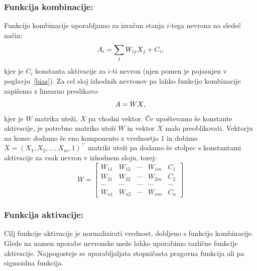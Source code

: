 \documentclass[mat1]{fmfdelo}
\begin{document}
\subsubsection{Funkcija kombinacije:}
Funkcijo kombinacije uporabljamo za izračun stanja $i$-tega nevrona na sledeč način:
%
\begin{equation*}
A_i= \sum_{j}W_{ij}X_j + C_i \text,
\end{equation*}
%
kjer je  $C_i$ konstanta aktivacije za $i$-ti nevron (njen pomen je pojasnjen v poglavju~\ref{bias}). 
Za cel sloj izhodnih nevronov pa lahko funkcijo kombinacije zapišemo z linearno preslikavo:
%
\begin{equation*}
A = WX \text,
\end{equation*}
%
kjer je $W$ matrika uteži, $X$ pa vhodni vektor. Če upoštevamo še konstante aktivacije, je potrebno matriko uteži $W$ in vektor $X$ malo preoblikovati. Vektorju na konec dodamo še eno komponento z vrednostjo $1$ in dobimo $X =  (X_1, X_2, \dotso, X_m, 1)^\intercal $ matriki uteži pa dodamo še stolpec s konstantami aktivacije za vsak nevron v izhodnem sloju, torej: 
%
\begin{equation*}
W = \begin{bmatrix}
W_{11} &W_{12}  & \cdots & W_{1m}  & C_1\\
W_{21}  &W_{22}  &\cdots & W_{2m}  & C_2\\
\cdots &\cdots  &\cdots &\cdots  &\cdots\\
W_{n1} & W_{n2} & \cdots & W_{nm} & C_n
\end{bmatrix}  
\end{equation*}
%
\subsubsection{Funkcija aktivacije:}
Cilj funkcije aktivacije je normalizirati vrednost, dobljeno s funkcijo kombinacije. Glede na namen uporabe nevronske meže lahko uporabimo različne funkcije aktivacije. Najpogosteje se uporabljaljata stopničasta pragovna funkcija ali pa sigmoidna funkcija. 
\end{document}
